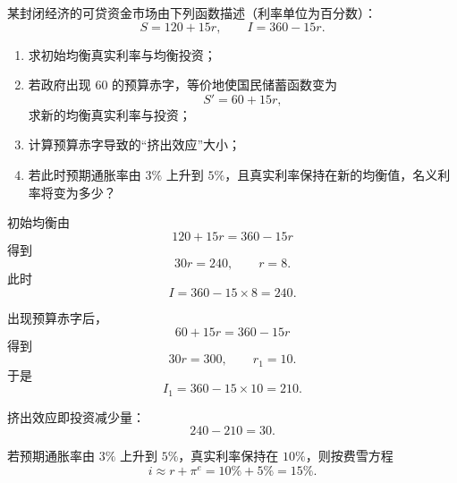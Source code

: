 \begin{question}
某封闭经济的可贷资金市场由下列函数描述（利率单位为百分数）：
\[
S=120+15r,\qquad I=360-15r.
\]

\begin{enumerate}[label=(\arabic*),leftmargin=2.5em]
  \item 求初始均衡真实利率与均衡投资；
  \item 若政府出现 60 的预算赤字，等价地使国民储蓄函数变为
  \[
  S'=60+15r,
  \]
  求新的均衡真实利率与投资；
  \item 计算预算赤字导致的“挤出效应”大小；
  \item 若此时预期通胀率由 $3\%$ 上升到 $5\%$，且真实利率保持在新的均衡值，名义利率将变为多少？
\end{enumerate}

\begin{solution}
初始均衡由
\[
120+15r=360-15r
\]
得到
\[
30r=240,\qquad r=8.
\]
此时
\[
I=360-15\times 8=240.
\]

出现预算赤字后，
\[
60+15r=360-15r
\]
得到
\[
30r=300,\qquad r_1=10.
\]
于是
\[
I_1=360-15\times 10=210.
\]

挤出效应即投资减少量：
\[
240-210=30.
\]

若预期通胀率由 $3\%$ 上升到 $5\%$，真实利率保持在 $10\%$，则按费雪方程
\[
i\approx r+\pi^e=10\%+5\%=15\%.
\]
\end{solution}
\end{question}

